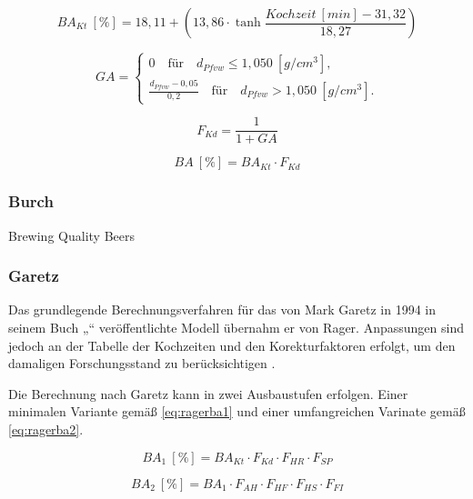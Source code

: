 \documentclass[a4paper,parskip=half]{scrartcl}
\newcommand{\BA}{\mathit{BA}}
\newcommand{\BAKt}{{\mathit{BA}}_{\mathit{Kt}}}
\newcommand{\umin}{\:[\mathit{min}]}
\newcommand{\uden}{\:[\mathit{g/cm^3}]}
\newcommand{\uper}{\:[\%]}
\newcommand{\FKd}{F_{\mathit{Kd}}}
\newcommand{\FHR}{F_{\mathit{HR}}}
\newcommand{\FSP}{F_{\mathit{SP}}}
\newcommand{\FAH}{F_{\mathit{AH}}}
\newcommand{\FHF}{F_{\mathit{HF}}}
\newcommand{\FHS}{F_{\mathit{HS}}}
\newcommand{\FFil}{F_{\mathit{FI}}}
\begin{document}
\begin{equation}
\BAKt \uper = 18,11 + \left(13,86 \cdot \tanh{\frac{\mathit{Kochzeit} \umin - 31,32}{18,27}}\right)
\label{eq:ragerbakt}
\end{equation}


\begin{equation}
\mathit{GA} = \begin{cases}
0 \quad \text{für} \quad d_{\mathit{Pfvw}} \le 1,050 \uden, \\
\frac{d_{\mathit{Pfvw}} - 0,05}{0,2} \quad \text{für} \quad d_{\mathit{Pfvw}} > 1,050 \uden.
\end{cases}
\label{eq:ragerga}
\end{equation}

\begin{equation}
\FKd = \frac{1}{1 + GA}
\label{eq:ragerfkd}
\end{equation}


\begin{equation}
\BA \uper = \BAKt \cdot \FKd
\label{eq:ragerba}
\end{equation}

\subsubsection*{Burch}
Brewing Quality Beers

\subsubsection*{Garetz}

Das grundlegende Berechnungsverfahren für das von Mark Garetz in 1994 in seinem
Buch „“ veröffentlichte Modell übernahm er
von Rager. Anpassungen sind jedoch an der Tabelle der Kochzeiten und den
Korekturfaktoren erfolgt, um den damaligen Forschungsstand zu berücksichtigen
\parencite[134-144]{Garetz1994}.

Die Berechnung nach Garetz kann in zwei Ausbaustufen erfolgen. Einer minimalen
Variante gemäß \autoref{eq:ragerba1} und einer umfangreichen Varinate gemäß
\autoref{eq:ragerba2}. 

\begin{equation}
\BA_1 \uper = \BAKt \cdot \FKd \cdot \FHR \cdot \FSP
\label{eq:ragerba1}
\end{equation}

\begin{equation}
\BA_2 \uper = BA_1 \cdot \FAH \cdot \FHF \cdot \FHS \cdot \FFil
\label{eq:ragerba2}
\end{equation}
\end{document}
